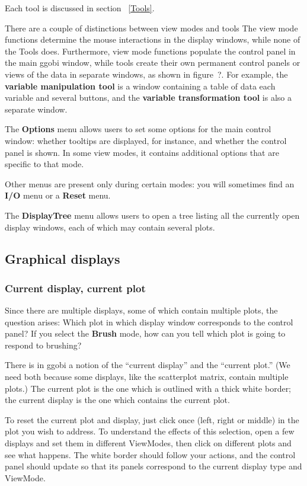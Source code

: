 \documentclass[11pt]{article}
\begin{document}
Each tool is discussed in section ~\ref{Tools}.

There are a couple of distinctions between view modes and tools
The view mode functions determine the mouse interactions in the
display windows, while none of the Tools does.  Furthermore,
view mode functions populate the control panel in the main ggobi
window, while tools create their own permanent control panels
or views of the data in separate windows, as shown in figure~?.  For
example, the {\bf variable manipulation tool} is a window containing
a table of data each variable and several buttons, and the {\bf
variable transformation tool} is also a separate window.

The {\bf Options} menu allows users to set some options for the
main control window:  whether tooltips are displayed, for instance,
and whether the control panel is shown.  In some view modes, it contains
additional options that are specific to that mode.

Other menus are present only during certain modes:  you will
sometimes find an {\bf I/O} menu or a {\bf Reset} menu.

The {\bf DisplayTree} menu allows users to open a tree listing
all the currently open display windows, each of which may contain
several plots.

\subsection{Graphical displays}
\label{slbl:GraphicalDisplays}

\subsubsection{Current display, current plot}

Since there are multiple displays, some of which contain multiple
plots, the question arises:  Which plot in which display window
corresponds to the control panel?  If you select the {\bf Brush} mode,
how can you tell which plot is going to respond to
brushing?

There is in ggobi a notion of the ``current display'' and the
``current plot.''  (We need both because some displays, like the
scatterplot matrix, contain multiple plots.) The current plot is the
one which is outlined with a thick white border; the current display
is the one which contains the current plot.

To reset the current plot and display, just click once (left, right
or middle) in the plot you wish to address.  To understand the
effects of this selection, open a few displays and set them in
different ViewModes, then click on different plots and see what
happens.  The white border should follow your actions, and the
control panel should update so that its panels correspond to the
current display type and ViewMode.
\end{document}
